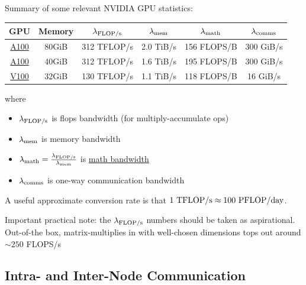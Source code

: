 \documentclass[11pt]{article}
\begin{document}
Summary of some relevant NVIDIA GPU statistics:
\begin{center}
\begin{tabular}{| c |c| c |c |c| c| }\hline
    GPU & Memory & $ \lambda _{ {\rm FLOP/s }  } $& $ \lambda _{ {\rm mem}  } $  & $ \lambda _{ {\rm math}  } $  & $ \lambda _{ {\rm comms}  } $\\ \hline
    \href{https://www.nvidia.com/content/dam/en-zz/Solutions/Data-Center/a100/pdf/nvidia-a100-datasheet-nvidia-us-2188504-web.pdf}{A100} & 80GiB&  312  TFLOP/s &   2.0 TiB/s  & 156 FLOPS/B & 300 GiB/s \\ \hline
    \href{https://www.nvidia.com/content/dam/en-zz/Solutions/Data-Center/a100/pdf/nvidia-a100-datasheet.pdf}{A100}& 40GiB&  312  TFLOP/s &   1.6 TiB/s  & 195 FLOPS/B & 300 GiB/s \\ \hline
    \href{https://images.nvidia.com/content/technologies/volta/pdf/volta-v100-datasheet-update-us-1165301-r5.pdf}{V100} & 32GiB&  130  TFLOP/s &   1.1 TiB/s  & 118  FLOPS/B & 16 GiB/s \\ \hline
\end{tabular}
\end{center}
where
\begin{itemize}
    \item $ \lambda _{ {\rm  FLOP/s}  } $ is flops bandwidth (for   multiply-accumulate ops)
    \item $ \lambda _{ {\rm  mem}  } $ is memory bandwidth
    \item $ \lambda _{ {\rm  math}  } = \frac{  \lambda _{ {\rm FLOP/s}  } }{ \lambda _{ {\rm mem} } } $ is \href{https://docs.nvidia.com/deeplearning/performance/dl-performance-gpu-background/index.html#gpu-arch}{math bandwidth}
    \item $ \lambda _{ {\rm  comms}  } $ is one-way communication bandwidth
\end{itemize}
A useful approximate conversion rate is that $ 1 \ {\rm TFLOP/s} \approx 100\  {\rm PFLOP/day} $.

Important practical note: the $ \lambda _{ {\rm FLOP/s} } $ numbers should be taken as aspirational.
Out-of-the box,  matrix-multiplies in  with well-chosen
dimensions tops out around $ \sim 250 $ FLOPS/s

\subsection{Intra- and Inter-Node Communication}
\end{document}
